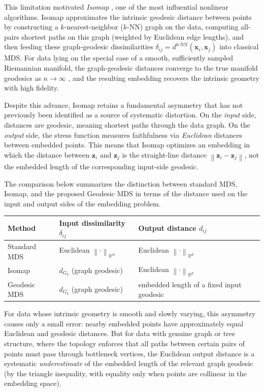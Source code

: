 \documentclass[11pt]{article}
\newcommand{\R}{\mathbb{R}}
\newcommand{\bx}{\mathbf{x}}
\newcommand{\bz}{\mathbf{z}}
\newcommand{\norm}[1]{\left\|#1\right\|}
\newcommand{\dknn}{d^{k\text{-NN}}}
\begin{document}
This limitation motivated \emph{Isomap}
\citep{tenenbaum2000global}, one of the most influential nonlinear
algorithms.  Isomap approximates the intrinsic geodesic distance between
points by constructing a $k$-nearest-neighbor ($k$-NN) graph on the data,
computing all-pairs shortest paths on this graph (weighted by Euclidean
edge lengths), and then feeding these graph-geodesic dissimilarities
$\delta_{ij} = \dknn(\bx_i, \bx_j)$ into classical MDS.  For data lying on
the special case of a smooth, sufficiently sampled Riemannian manifold, the graph-geodesic
distances converge to the true manifold geodesics as $n \to \infty$
\citep{bernstein2000graph, tenenbaum2000global}, and the resulting embedding
recovers the intrinsic geometry with high fidelity.

Despite this advance, Isomap retains a fundamental asymmetry that has not
previously been identified as a source of systematic distortion.  On the
\emph{input} side, distances are geodesic, meaning shortest paths through the data
graph.  On the \emph{output} side, the stress function measures faithfulness
via \emph{Euclidean} distances between embedded points.  This means that
Isomap optimizes an embedding in which the distance between $\bz_i$ and
$\bz_j$ is the straight-line distance $\norm{\bz_i - \bz_j}$, not the
embedded length of the corresponding input-side geodesic.

The comparison below summarizes the distinction between standard MDS,
Isomap, and the proposed Geodesic MDS in terms of the distance used on
the input and output sides of the embedding problem.

\begin{center}
  \small
  \begin{tabular}{@{}p{}p{}p{}@{}}
    \toprule
    Method & Input dissimilarity $\delta_{ij}$ & Output distance $d_{ij}$ \\
    \midrule
    Standard MDS & Euclidean $\norm{\cdot}_{\R^m}$ & Euclidean $\norm{\cdot}_{\R^d}$ \\
    Isomap & $d_{G_k}$ (graph geodesic) & Euclidean $\norm{\cdot}_{\R^d}$ \\
    Geodesic MDS & $d_{G_k}$ (graph geodesic) & embedded length of a fixed input geodesic \\
    \bottomrule
  \end{tabular}
\end{center}

For data whose intrinsic geometry is smooth and slowly varying, this
asymmetry causes only a small error: nearby embedded points have
approximately equal Euclidean and geodesic distances.  But for data with
genuine graph or tree structure, where the topology enforces that all
paths between certain pairs of points must pass through bottleneck
vertices, the Euclidean output distance is a systematic \emph{underestimate}
of the embedded length of the relevant graph geodesic (by the triangle inequality, with
equality only when points are collinear in the embedding space).
\end{document}
